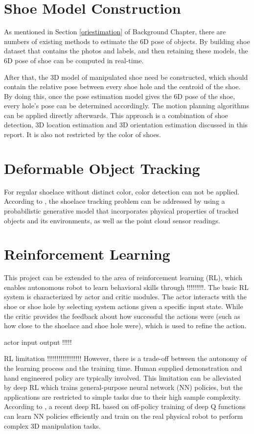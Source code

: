 \section{Shoe Model Construction}
As mentioned in Section \ref{oriestimation} of Background Chapter, there are numbers of existing methods to estimate the 6D pose of objects. By building shoe dataset that contains the photos and labels, and then retaining these models, the 6D pose of shoe can be computed in real-time. 

After that, the 3D model of manipulated shoe need be constructed, which should contain the relative pose between every shoe hole and the centroid of the shoe. By doing this, once the pose estimation model gives the 6D pose of the shoe, every hole's pose can be determined accordingly. The motion planning algorithms can be applied directly afterwards. This approach is a combination of shoe detection, 3D location estimation and 3D orientation estimation discussed in this report. It is also not restricted by the color of shoes.

\section{Deformable Object Tracking}
For regular shoelace without distinct color, color detection can not be applied. According to \citep{deformable_track}, the shoelace tracking problem can be addressed by using a probabilistic generative model that incorporates physical properties of tracked objects and its environments, as well as the point cloud sensor readings. 

\section{Reinforcement Learning}
This project can be extended to the area of reinforcement learning (RL), which enables autonomous robot to learn behavioral skills through !!!!!!!!!. The basic RL system is characterized by actor and critic modules. The actor interacts with the shoe or shoe hole by selecting system actions given a specific input state. While the critic provides the feedback about how successful the actions were (such as how close to the shoelace and shoe hole were), which is used to refine the action.

actor input output !!!!!

RL limitation !!!!!!!!!!!!!!!!!! However, there is a trade-off between the autonomy of the learning process and the training time. Human supplied demonstration and hand engineered policy are typically involved. This limitation can be alleviated by deep RL which trains general-purpose neural network (NN) policies, but the applications are restricted to simple tasks due to their high sample complexity. According to \citep{reinforcementl}, a recent deep RL based on off-policy training of deep Q functions can learn NN policies efficiently and train on the real physical robot to perform complex 3D manipulation tasks.